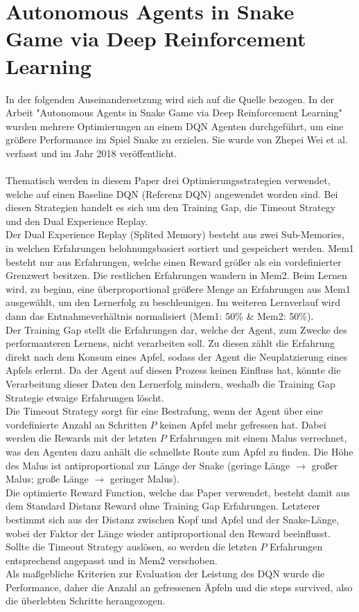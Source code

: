 \section{Autonomous Agents in Snake Game via Deep Reinforcement Learning} \label{sec:Paper_1}
In der folgenden Auseinandersetzung wird sich auf die Quelle \cite{Autonomous_Agents_in_Snake_Game_via_DRL} bezogen.
In der Arbeit "Autonomous Agents in Snake Game via Deep Reinforcement Learning" wurden mehrere Optimierungen an einem DQN Agenten durchgeführt, um eine größere Performance im Spiel Snake zu erzielen. Sie wurde von Zhepei Wei et al. verfasst und im Jahr 2018 veröffentlicht.\\
\\Thematisch werden in diesem Paper drei Optimierungsstrategien verwendet, welche auf einen Baseline DQN (Referenz DQN) angewendet worden sind. Bei diesen Strategien handelt es sich um den Training Gap, die Timeout Strategy und den Dual Experience Replay.\\
Der Dual Experience Replay (Splited Memory) besteht aus zwei Sub-Memories, in welchen Erfahrungen belohnungsbasiert sortiert und gespeichert werden. Mem1 besteht nur aus Erfahrungen, welche einen Reward größer als ein vordefinierter Grenzwert besitzen. Die restlichen Erfahrungen wandern in Mem2. Beim Lernen wird, zu beginn, eine überproportional größere Menge an Erfahrungen aus Mem1 ausgewählt, um den Lernerfolg zu beschleunigen. Im weiteren Lernverlauf wird dann das Entnahmeverhältnis normalisiert (Mem1: 50\% \& Mem2: 50\%).\\
Der Training Gap stellt die Erfahrungen dar, welche der Agent, zum Zwecke des performanteren Lernens, nicht verarbeiten soll. Zu diesen zählt die Erfahrung direkt nach dem Konsum eines Apfel, sodass der Agent die Neuplatzierung eines Apfels erlernt. Da der Agent auf diesen Prozess keinen Einfluss hat, könnte die Verarbeitung dieser Daten den Lernerfolg mindern, weshalb die Training Gap Strategie etwaige Erfahrungen löscht.\\
Die Timeout Strategy sorgt für eine Bestrafung, wenn der Agent über eine vordefinierte Anzahl an Schritten $P$ keinen Apfel mehr gefressen hat. Dabei werden die Rewards mit der letzten $P$ Erfahrungen mit einem Malus verrechnet, was den Agenten dazu anhält die schnellste Route zum Apfel zu finden. Die Höhe des Malus ist antiproportional zur Länge der Snake (geringe Länge $\rightarrow$ großer Malus; große Länge $\rightarrow$ geringer Malus).\\
Die optimierte Reward Function, welche das Paper verwendet, besteht damit aus dem Standard Distanz Reward ohne Training Gap Erfahrungen. Letzterer bestimmt sich aus der Distanz zwischen Kopf und Apfel und der Snake-Länge, wobei der Faktor der Länge wieder antiproportional den Reward beeinflusst. Sollte die Timeout Strategy auslösen, so werden die letzten $P$ Erfahrungen entsprechend angepasst und in Mem2 verschoben.\\
Als maßgebliche Kriterien zur Evaluation der Leistung des DQN wurde die Performance, daher die Anzahl an gefressenen Äpfeln und die steps survived, also die überlebten Schritte herangezogen.

